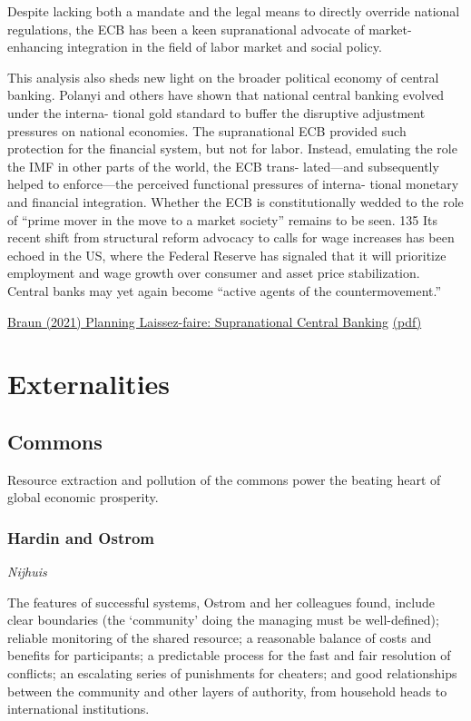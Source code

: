 \documentclass[
]{book}
\begin{document}
Despite lacking both a mandate and the legal
means to directly override national regulations, the ECB has been a keen supranational
advocate of market-enhancing integration in the field of labor market and social policy.

This analysis also sheds new light on the broader political economy of central banking.
Polanyi and others have shown that national central banking evolved under the interna-
tional gold standard to buffer the disruptive adjustment pressures on national economies.
The supranational ECB provided such protection for the financial system, but not for
labor. Instead, emulating the role the IMF in other parts of the world, the ECB trans-
lated---and subsequently helped to enforce---the perceived functional pressures of interna-
tional monetary and financial integration. Whether the ECB is constitutionally wedded
to the role of ``prime mover in the move to a market society'' remains to be seen. 135 Its
recent shift from structural reform advocacy to calls for wage increases has been echoed
in the US, where the Federal Reserve has signaled that it will prioritize employment and
wage growth over consumer and asset price stabilization. Central banks may yet again
become ``active agents of the countermovement.''

\href{https://osf.io/preprints/socarxiv/dp3nv}{Braun (2021) Planning Laissez-faire: Supranational Central Banking}
\href{pdf/Braun_2021_Planning_laissez-faire.pdf}{(pdf)}

\hypertarget{externalities}{%
\chapter{Externalities}\label{externalities}}

\hypertarget{commons}{%
\section{Commons}\label{commons}}

Resource extraction and pollution of the commons
power the beating heart of global economic prosperity.

\hypertarget{hardin-and-ostrom}{%
\subsection{Hardin and Ostrom}\label{hardin-and-ostrom}}

\emph{Nijhuis}

The features of successful systems, Ostrom and her colleagues found, include clear boundaries (the `community' doing the managing must be well-defined); reliable monitoring of the shared resource; a reasonable balance of costs and benefits for participants; a predictable process for the fast and fair resolution of conflicts; an escalating series of punishments for cheaters; and good relationships between the community and other layers of authority, from household heads to international institutions.
\end{document}
